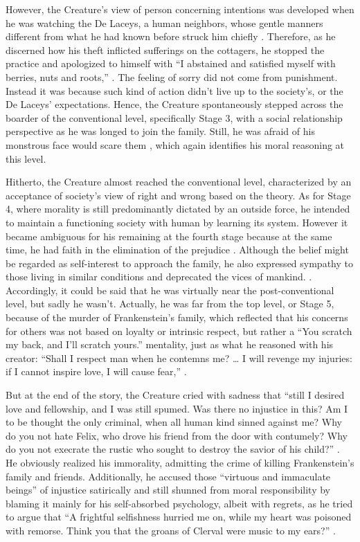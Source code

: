 \begin{text}
However, the Creature's view of person concerning intentions was developed when he was watching the De Laceys, a human neighbors, whose gentle manners different from what he had known before struck him chiefly . Therefore, as he discerned how his theft inflicted sufferings on the cottagers, he stopped the practice and apologized to himself with ``I abstained and satisfied myself with berries, nuts and roots,'' . The feeling of sorry did not come from punishment. Instead it was because such kind of action didn't live up to the society's, or the De Laceys' expectations. Hence, the Creature spontaneously stepped across the boarder of the conventional level, specifically Stage 3, with a social relationship perspective as he was longed to join the family. Still, he was afraid of his monstrous face would scare them , which again identifies his moral reasoning at this level.

Hitherto, the Creature almost reached the conventional level, characterized by an acceptance of society's view of right and wrong based on the theory. As for Stage 4, where morality is still predominantly dictated by an outside force, he intended to maintain a functioning society with human by learning its system. However it became ambiguous for his remaining at the fourth stage because at the same time, he had faith in the elimination of the prejudice . Although the belief might be regarded as self-interest to approach the family, he also expressed sympathy to those living in similar conditions and deprecated the vices of mankind. . Accordingly, it could be said that he was virtually near the post-conventional level, but sadly he wasn't. Actually, he was far from the top level, or Stage 5, because of the murder of Frankenstein's family, which reflected that his concerns for others was not based on loyalty or intrinsic respect, but rather a ``You scratch my back, and I'll scratch yours.'' mentality, just as what he reasoned with his creator: ``Shall I respect man when he contemns me? \dots{} I will revenge my injuries: if I cannot inspire love, I will cause fear,'' .

But at the end of the story, the Creature cried with sadness that ``still I desired love and fellowship, and I was still spumed. Was there no injustice in this? Am I to be thought the only criminal, when all human kind sinned against me? Why do you not hate Felix, who drove his friend from the door with contumely? Why do you not execrate the rustic who sought to destroy the savior of his child?'' . He obviously realized his immorality, admitting the crime of killing Frankenstein's family and friends. Additionally, he accused those ``virtuous and immaculate beings'' of injustice satirically and still shunned from moral responsibility by blaming it mainly for his self-absorbed psychology, albeit with regrets, as he tried to argue that ``A frightful selfishness hurried me on, while my heart was poisoned with remorse. Think you that the groans of Clerval were music to my ears?'' .


\end{text}
